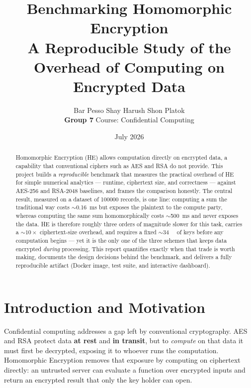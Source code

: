 \documentclass[11pt,a4paper]{article}
\title{\vspace{-1.2cm}\textbf{Benchmarking Homomorphic Encryption}\\[0.3em]
  \large A Reproducible Study of the Overhead of Computing on Encrypted Data}
\author{%
  Bar Pesso \quad\textbullet\quad Shay Harush \quad\textbullet\quad Shon Platok\\[0.4em]
  \textbf{Group 7} \quad\textbullet\quad Course: Confidential Computing}
\date{July 2026}
\begin{document}
\maketitle
\thispagestyle{empty}

\begin{abstract}
\noindent
Homomorphic Encryption (HE) allows computation directly on encrypted data, a
capability that conventional ciphers such as AES and RSA do not provide. This
project builds a \emph{reproducible} benchmark that measures the practical
overhead of HE for simple numerical analytics --- runtime, ciphertext size, and
correctness --- against AES-256 and RSA-2048 baselines, and frames the
comparison honestly. The central result, measured on a dataset of
\num{100000} records, is one line: computing a sum the traditional way costs
$\sim$\SI{0.16}{\milli\second} but exposes the plaintext to the compute party,
whereas computing the same sum homomorphically costs $\sim$\SI{500}{\milli\second}
and never exposes the data. HE is therefore roughly three orders of magnitude
slower for this task, carries a $\sim$$10\times$ ciphertext-size overhead, and
requires a fixed $\sim$\SI{34}{\mega\byte} of keys before any computation begins
--- yet it is the only one of the three schemes that keeps data encrypted
\emph{during} processing. This report quantifies exactly when that trade is
worth making, documents the design decisions behind the benchmark, and delivers
a fully reproducible artifact (Docker image, test suite, and interactive
dashboard).
\end{abstract}

\tableofcontents
\newpage

\section{Introduction and Motivation}

Confidential computing addresses a gap left by conventional cryptography. AES and
RSA protect data \textbf{at rest} and \textbf{in transit}, but to \emph{compute}
on that data it must first be decrypted, exposing it to whoever runs the
computation. Homomorphic Encryption removes that exposure by computing on
ciphertext directly: an untrusted server can evaluate a function over encrypted
inputs and return an encrypted result that only the key holder can open.
\end{document}
